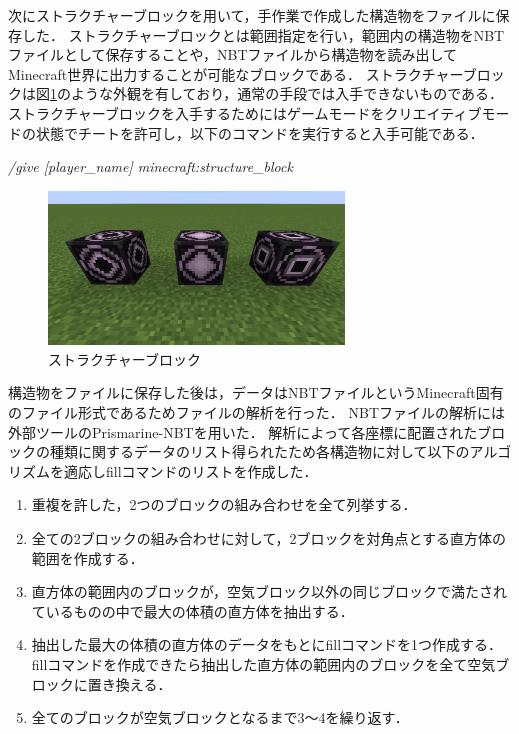次にストラクチャーブロックを用いて，手作業で作成した構造物をファイルに保存した．
ストラクチャーブロックとは範囲指定を行い，範囲内の構造物をNBTファイルとして保存することや，NBTファイルから構造物を読み出してMinecraft世界に出力することが可能なブロックである．
ストラクチャーブロックは図\ref{fig:structure_block}のような外観を有しており，通常の手段では入手できないものである．ストラクチャーブロックを入手するためにはゲームモードをクリエイティブモードの状態でチートを許可し，以下のコマンドを実行すると入手可能である．
\begin{center}
    \textit{/give [player\_name] minecraft:structure\_block}
\end{center}

\begin{figure}[H]
    \centering
    \includegraphics[width=0.7\textwidth]{fig/structure_block.png}
    \caption{ストラクチャーブロック}
    \label{fig:structure_block}
\end{figure}

構造物をファイルに保存した後は，データはNBTファイルというMinecraft固有のファイル形式であるためファイルの解析を行った．
NBTファイルの解析には外部ツールのPrismarine-NBT\cite{bib:prismarine-nbt}を用いた．
解析によって各座標に配置されたブロックの種類に関するデータのリスト得られたため各構造物に対して以下のアルゴリズムを適応しfillコマンドのリストを作成した．

\begin{enumerate}
    \item 重複を許した，2つのブロックの組み合わせを全て列挙する．
    \item 全ての2ブロックの組み合わせに対して，2ブロックを対角点とする直方体の範囲を作成する．
    \item 直方体の範囲内のブロックが，空気ブロック以外の同じブロックで満たされているものの中で最大の体積の直方体を抽出する．
    \item 抽出した最大の体積の直方体のデータをもとにfillコマンドを1つ作成する．fillコマンドを作成できたら抽出した直方体の範囲内のブロックを全て空気ブロックに置き換える．
    \item 全てのブロックが空気ブロックとなるまで3～4を繰り返す．
\end{enumerate}

